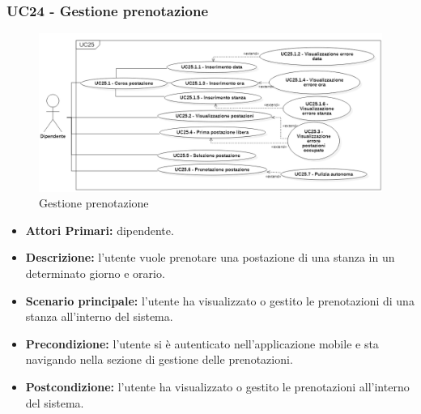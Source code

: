 \subsubsection{ UC24 - Gestione prenotazione }
\begin{figure}[H]
	\centering
	\includegraphics[width=18cm]{res/images/UC24.png}
	\caption{Gestione prenotazione}
	\label{fig:Gestione prenotazione}
\end{figure}
\begin{itemize}
	\item\textbf{Attori Primari:} dipendente.
	\item\textbf{Descrizione:} l’utente vuole prenotare una postazione di una stanza in un determinato giorno e orario.
	\item\textbf{Scenario principale:} l’utente ha visualizzato o gestito le prenotazioni di una stanza all’interno del sistema.
	\item\textbf{Precondizione:} l’utente si è autenticato nell'applicazione mobile e sta navigando nella sezione di gestione delle prenotazioni.
	\item\textbf{Postcondizione:} l’utente ha visualizzato o gestito le prenotazioni all’interno del sistema.
\end{itemize}

